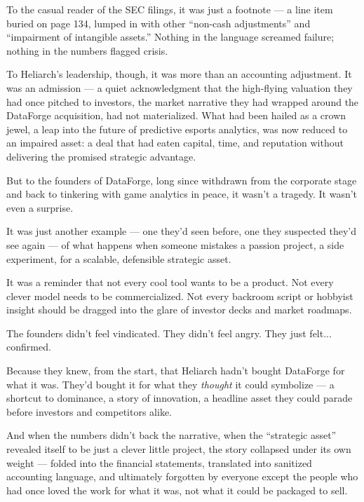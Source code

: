 To the casual reader of the SEC filings, it was just a footnote —
a line item buried on page 134, lumped in with other “non-cash adjustments” and “impairment of intangible assets.”
Nothing in the language screamed failure; nothing in the numbers flagged crisis.

To Heliarch’s leadership, though, it was more than an accounting adjustment.
It was an admission — a quiet acknowledgment that the high-flying valuation they had once pitched to investors, the market narrative they had wrapped around the DataForge acquisition, had not materialized.
What had been hailed as a crown jewel, a leap into the future of predictive esports analytics, was now reduced to an impaired asset: a deal that had eaten capital, time, and reputation without delivering the promised strategic advantage.

But to the founders of DataForge, long since withdrawn from the corporate stage and back to tinkering with game analytics in peace, it wasn’t a tragedy.
It wasn’t even a surprise.

It was just another example —
one they’d seen before,
one they suspected they’d see again —
of what happens when someone mistakes a passion project, a side experiment,
for a scalable, defensible strategic asset.

It was a reminder that not every cool tool wants to be a product.
Not every clever model needs to be commercialized.
Not every backroom script or hobbyist insight should be dragged into the glare of investor decks and market roadmaps.

The founders didn’t feel vindicated.
They didn’t feel angry.
They just felt... confirmed.

Because they knew, from the start, that Heliarch hadn’t bought DataForge for what it was.
They’d bought it for what they \textit{thought} it could symbolize —
a shortcut to dominance, a story of innovation, a headline asset they could parade before investors and competitors alike.

And when the numbers didn’t back the narrative,
when the “strategic asset” revealed itself to be just a clever little project,
the story collapsed under its own weight —
folded into the financial statements,
translated into sanitized accounting language,
and ultimately forgotten by everyone except the people who had once loved the work for what it was,
not what it could be packaged to sell.

